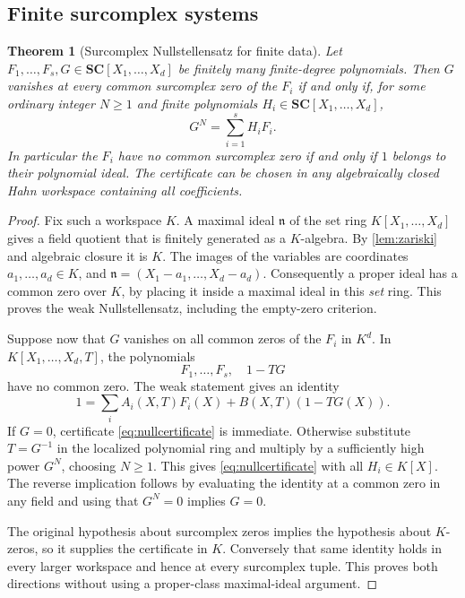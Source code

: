 \documentclass[11pt,letterpaper]{article}
\numberwithin{equation}{section}
\newtheorem{theorem}{Theorem}[section]
\theoremstyle{definition}
\theoremstyle{remark}
\newcommand{\SC}{\mathbf{SC}}
\begin{document}
\subsection{Finite surcomplex systems}
\begin{theorem}[Surcomplex Nullstellensatz for finite data]\label{thm:nullstellensatz}
Let $F_1,\ldots,F_s,G\in\SC[X_1,\ldots,X_d]$ be finitely many
finite-degree polynomials. Then $G$ vanishes at every common surcomplex
zero of the $F_i$ if and only if, for some ordinary integer $N\ge1$ and
finite polynomials $H_i\in\SC[X_1,\ldots,X_d]$,
\begin{equation}\label{eq:nullcertificate}
 G^N=\sum_{i=1}^sH_iF_i.
\end{equation}
In particular the $F_i$ have no common surcomplex zero if and only if
$1$ belongs to their polynomial ideal. The certificate can be chosen in
any algebraically closed Hahn workspace containing all coefficients.
\end{theorem}
\begin{proof}
Fix such a workspace $K$. A maximal ideal $\mathfrak n$ of the set ring
$K[X_1,\ldots,X_d]$ gives a field quotient that is finitely generated as
a $K$-algebra. By \cref{lem:zariski} and algebraic closure it is $K$.
The images of the variables are coordinates $a_1,\ldots,a_d\in K$,
and $\mathfrak n=(X_1-a_1,\ldots,X_d-a_d)$. Consequently a proper ideal
has a common zero over $K$, by placing it inside a maximal ideal in this
\emph{set} ring. This proves the weak Nullstellensatz, including the
empty-zero criterion.

Suppose now that $G$ vanishes on all common zeros of the $F_i$ in $K^d$.
In $K[X_1,\ldots,X_d,T]$, the polynomials
\[
 F_1,\ldots,F_s,\quad 1-TG
\]
have no common zero. The weak statement gives an identity
\[
 1=\sum_i A_i(X,T)F_i(X)+B(X,T)(1-TG(X)).
\]
If $G=0$, certificate \eqref{eq:nullcertificate} is immediate. Otherwise
substitute $T=G^{-1}$ in the localized polynomial ring and multiply by a
sufficiently high power $G^N$, choosing $N\ge1$. This gives
\eqref{eq:nullcertificate} with all $H_i\in K[X]$. The reverse implication
follows by evaluating the identity at a common zero in any field and
using that $G^N=0$ implies $G=0$.

The original hypothesis about surcomplex zeros implies the hypothesis
about $K$-zeros, so it supplies the certificate in $K$. Conversely that
same identity holds in every larger workspace and hence at every
surcomplex tuple. This proves both directions without using a
proper-class maximal-ideal argument.
\end{proof}
\end{document}
